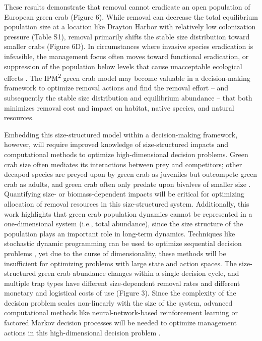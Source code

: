 \documentclass{article}
\begin{document}
These results demonstrate that removal cannot eradicate an open population of European green crab (Figure 6). While removal can decrease the total equilibrium population size at a location like Drayton Harbor with relatively low colonization pressure (Table S1), removal primarily shifts the stable size distribution toward smaller crabs (Figure 6D). In circumstances where invasive species eradication is infeasible, the management focus often moves toward functional eradication, or suppression of the population below levels that cause unacceptable ecological effects \parencite{green2021functional}. The IPM\textsuperscript{2} green crab model may become valuable in a decision-making framework to optimize removal actions and find the removal effort – and subsequently the stable size distribution and equilibrium abundance – that both minimizes removal cost and impact on habitat, native species, and natural resources. 

Embedding this size-structured model within a decision-making framework, however, will require improved knowledge of size-structured impacts and computational methods to optimize high-dimensional decision problems. Green crab size often mediates its interactions between prey and competitors; other decapod species are preyed upon by green crab as juveniles but outcompete green crab as adults, and green crab often only predate upon bivalves of smaller size \parencite{grosholz2005recent, williams2009competition, mcdonald2001competitive, curtis2012prey}. Quantifying size- or biomass-dependent impacts will be critical for optimizing allocation of removal resources in this size-structured system. Additionally, this work highlights that green crab population dynamics cannot be represented in a one-dimensional system (i.e., total abundance), since the size structure of the population plays an important role in long-term dynamics. Techniques like stochastic dynamic programming can be used to optimize sequential decision problems \parencite{marescot2013complex}, yet due to the curse of dimensionality, these methods will be insufficient for optimizing problems with large state and action spaces. The size-structured green crab abundance changes within a single decision cycle, and multiple trap types have different size-dependent removal rates and different monetary and logistical costs of use (Figure 3). Since the complexity of the decision problem scales non-linearly with the size of the system, advanced computational methods like neural-network-based reinforcement learning or factored Markov decision processes will be needed to optimize management actions in this high-dimensional decision problem \parencite{lapeyrolerie2022deep, nicol2015adapting}. 
\end{document}
